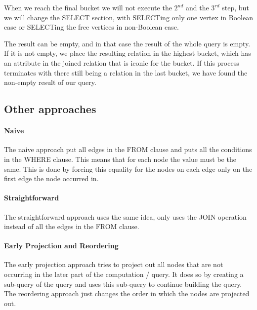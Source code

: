 When we reach the final bucket we will not execute the $2^{nd}$ and the $3^{rd}$ step, but we will change the SELECT section, with SELECTing only one vertex in Boolean case or SELECTing the free vertices in non-Boolean case.

The result can be empty, and in that case the result of the whole query is empty. If it is not empty, we place the resulting relation in the highest bucket, which has an attribute in the joined relation that is iconic for the bucket. If this process terminates with there still being a relation in the last bucket, we have found the non-empty result of our query.

\subsection{Other approaches} \label{subsec:MethodologyOtherApproaches}
\paragraph{Naive} The naive approach put all edges in the FROM clause and puts all the conditions in the WHERE clause. This means that for each node the value must be the same. This is done by forcing this equality for the nodes on  each edge only on the first edge the node occurred in. 

\paragraph{Straightforward} The straightforward approach uses the same idea, only uses the JOIN operation instead of all the edges in the FROM clause. 

\paragraph{Early Projection and Reordering} The early projection approach tries to project out all nodes that are not occurring in the later part of the computation / query.  It does so by creating a sub-query of the query and uses this sub-query to continue building the query. The reordering approach just changes the order in which the nodes are projected out. 